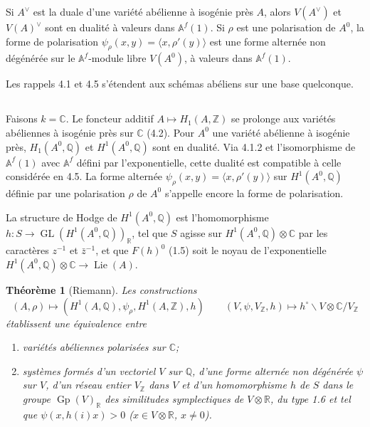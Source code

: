 \documentclass[11pt]{amsart}
\theoremstyle{plain}
\newtheorem{theorem}{Th\'eor\`eme}[section]
\theoremstyle{definition}
\DeclareMathOperator{\Lie}{Lie}
\DeclareMathOperator{\GL}{GL}
\DeclareMathOperator{\Gp}{Gp}
\newcommand{\ZZ}{\mathbb{Z}}
\newcommand{\QQ}{\mathbb{Q}}
\newcommand{\RR}{\mathbb{R}}
\newcommand{\CC}{\mathbb{C}}
\newcommand{\AAf}{\mathbb{A}^f}
\begin{document}
Si $A^\vee$ est la duale d'une vari\'et\'e ab\'elienne \`a isog\'enie pr\`es $A$, alors $V(A^\vee)$ et $V(A)^\vee$ sont en dualit\'e \`a valeurs dans $\AAf(1)$. Si $\rho$ est une polarisation de $A^0$, la forme de polarisation $\psi_\rho(x,y) = \langle x, \rho'(y) \rangle$ est une forme altern\'ee non d\'eg\'en\'er\'ee sur le $\AAf$-module libre $V(A^0)$, \`a valeurs dans $\AAf(1)$.

Les rappels 4.1 et 4.5 s'\'etendent aux sch\'emas ab\'eliens sur une base quelconque.

\subsection{}

Faisons $k = \CC$. Le foncteur additif $A \mapsto H_1(A, \ZZ)$ se prolonge aux vari\'et\'es ab\'eliennes \`a isog\'enie pr\`es sur $\CC$ (4.2). Pour $A^0$ une vari\'et\'e ab\'elienne \`a isog\'enie pr\`es, $H_1(A^0, \QQ)$ et $H^1(A^0, \QQ)$ sont en dualit\'e. Via 4.1.2 et l'isomorphisme de $\AAf(1)$ avec $\AAf$ d\'efini par l'exponentielle, cette dualit\'e est compatible \`a celle consid\'er\'ee en 4.5. La forme altern\'ee $\psi_\rho(x,y) = \langle x, \rho'(y) \rangle$ sur $H^1(A^0, \QQ)$ d\'efinie par une polarisation $\rho$ de $A^0$ s'appelle encore la forme de polarisation.

La structure de Hodge de $H^1(A^0, \QQ)$ est l'homomorphisme $h : S \to \GL(H^1(A^0, \QQ))_{\RR}$, tel que $S$ agisse sur $H^1(A^0, \QQ) \otimes \CC$ par les caract\`eres $z^{-1}$ et $\bar{z}^{-1}$, et que $F(h)^0$ (1.5) soit le noyau de l'exponentielle $H^1(A^0, \QQ) \otimes \CC \to \Lie(A)$.

\begin{theorem}[Riemann]
Les constructions
\[
(A, \rho) \longmapsto (H^1(A, \QQ), \psi_\rho, H^1(A, \ZZ), h) \qquad (V, \psi, V_{\ZZ}, h) \longmapsto h^\circ \backslash V \otimes \CC / V_{\ZZ}
\]
\'etablissent une \'equivalence entre
\begin{enumerate}
\item[(a)] vari\'et\'es ab\'eliennes polaris\'ees sur $\CC$;
\item[(b)] syst\`emes form\'es d'un vectoriel $V$ sur $\QQ$, d'une forme altern\'ee non d\'eg\'en\'er\'ee $\psi$ sur $V$, d'un r\'eseau entier $V_{\ZZ}$ dans $V$ et d'un homomorphisme $h$ de $S$ dans le groupe $\Gp(V)_{\RR}$ des similitudes symplectiques de $V \otimes \RR$, du type 1.6 et tel que $\psi(x, h(i)x) > 0$ ($x \in V \otimes \RR$, $x \neq 0$).
\end{enumerate}
\end{theorem}
\end{document}
